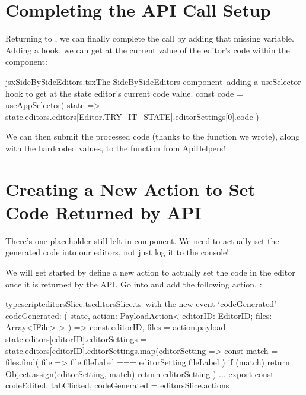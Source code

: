 \documentclass[a4paper,headinclude=on,footinclude=on,12pt,oneside]{scrbook}
\begin{document}
\section{Completing the API Call Setup}

Returning to , we can finally complete the call by adding that missing  variable. Adding a  hook, we can get at the current value of the editor's code within the  component: 

\begin{codeInput}{jsx}{SideBySideEditors.tsx}{The SideBySideEditors component\, adding a useSelector hook to get at the state editor's current code value.}
const code = useAppSelector(
  state => state.editors.editors[Editor.TRY_IT_STATE].editorSettings[0].code
)
\end{codeInput}

We can then submit the processed code (thanks to the  function we wrote), along with the hardcoded values, to the  function from ApiHelpers!

\section{Creating a New Action to Set Code Returned by API}

There's one placeholder  still left in  component. We need to actually set the generated code into our editors, not just log it to the console!


We will get started by define a new action to actually set the code in the editor once it is returned by the API. Go into  and add the following action, :

\begin{codeInput}{typescript}{editorsSlice.ts}{editorsSlice.ts\, with the new event `codeGenerated'}
codeGenerated: (
  state,
  action: PayloadAction<{ editorID: EditorID; files: Array<IFile> }>
) => {
  const { editorID, files } = action.payload
  state.editors[editorID].editorSettings = state.editors[editorID].editorSettings.map(editorSetting => {
    const match = files.find(
      file => file.fileLabel === editorSetting.fileLabel
    )
    if (match) {
      return Object.assign(editorSetting, match)
    }
    return editorSetting
  })
}
...
export const { codeEdited, tabClicked, codeGenerated } = editorsSlice.actions
\end{codeInput}
\end{document}
